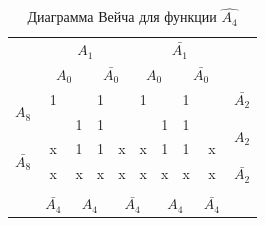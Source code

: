 \documentclass[a4paper,14pt]{article}
\begin{document}
\begin{table}[H]
	\begin{minipage}{.5\linewidth}
		\caption{Диаграмма Вейча для функции $\hat{A_4}$}
		\centering
		\begin{tabular}{cccccccccc}
			& \multicolumn{4}{c}{$A_1$}                                                                         & \multicolumn{4}{c}{$\bar{A_1}$}                                                                   &                        \\
			& \multicolumn{2}{c}{$A_0$}                       & \multicolumn{2}{c}{$\bar{A_0}$}                 & \multicolumn{2}{c}{$A_0$}                       & \multicolumn{2}{c}{$\bar{A_0}$}                 &                        \\ \cline{2-9}
			\multicolumn{1}{c|}{\multirow{2}{*}{$A_8$}}       & \multicolumn{1}{c|}{1} & \multicolumn{1}{c|}{}  & \multicolumn{1}{c|}{1} & \multicolumn{1}{c|}{}  & \multicolumn{1}{c|}{1} & \multicolumn{1}{c|}{}  & \multicolumn{1}{c|}{1} & \multicolumn{1}{c|}{}  & $\bar{A_2}$            \\ \cline{2-9}
			\multicolumn{1}{c|}{}                             & \multicolumn{1}{c|}{}  & \multicolumn{1}{c|}{1} & \multicolumn{1}{c|}{1} & \multicolumn{1}{c|}{}  & \multicolumn{1}{c|}{}  & \multicolumn{1}{c|}{1} & \multicolumn{1}{c|}{1} & \multicolumn{1}{c|}{}  & \multirow{2}{*}{$A_2$} \\ \cline{2-9}
			\multicolumn{1}{c|}{\multirow{2}{*}{$\bar{A_8}$}} & \multicolumn{1}{c|}{x} & \multicolumn{1}{c|}{1} & \multicolumn{1}{c|}{1} & \multicolumn{1}{c|}{x} & \multicolumn{1}{c|}{x} & \multicolumn{1}{c|}{1} & \multicolumn{1}{c|}{1} & \multicolumn{1}{c|}{x} &                        \\ \cline{2-9}
			\multicolumn{1}{c|}{}                             & \multicolumn{1}{c|}{x} & \multicolumn{1}{c|}{x} & \multicolumn{1}{c|}{x} & \multicolumn{1}{c|}{x} & \multicolumn{1}{c|}{x} & \multicolumn{1}{c|}{x} & \multicolumn{1}{c|}{x} & \multicolumn{1}{c|}{x} & $\bar{A_2}$            \\ \cline{2-9}
			\\
			& $\bar{A_4}$            & \multicolumn{2}{c}{$A_4$}                       & \multicolumn{2}{c}{$\bar{A_4}$}                 & \multicolumn{2}{c}{$A_4$}                       & $\bar{A_4}$            &                       
		\end{tabular}
	\end{minipage}%
	\begin{minipage}{.5\linewidth}

\end{minipage}
\end{table}
\end{document}
